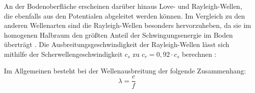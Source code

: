 An der Bodenoberfläche erscheinen darüber hinaus Love- und Rayleigh-Wellen, die ebenfalls aus den Potentialen abgeleitet werden können. 
Im Vergleich zu den anderen Wellenarten sind die Rayleigh-Wellen besonders hervorzuheben, da sie im homogenen Halbraum den größten Anteil der Schwingungsenergie im Boden überträgt \citep{Haupt1986}.
Die Ausbreitungsgeschwindigkeit der Rayleigh-Wellen lässt sich mithilfe der Scherwellengeschwindigkeit $c_s$ zu $c_r = 0,92 \cdot c_s$ berechnen \citep{Petersen2000}:

Im Allgemeinen besteht bei der Wellenausbreitung der folgende Zusammenhang:
\begin{equation}\label{eq:lambda_cf}
	\lambda = \frac{c}{f}\,
\end{equation}







